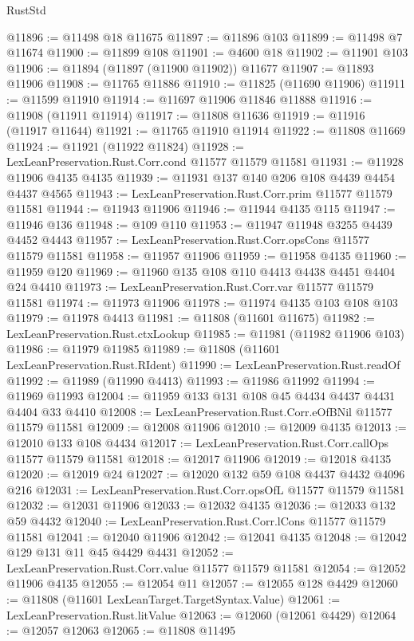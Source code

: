 \begin{lexlean}{RustStd}
\begin{coremodule}
@11896 := @11498 @18 @11675
@11897 := @11896 @103
@11899 := @11498 @7 @11674
@11900 := @11899 @108
@11901 := @4600 @18
@11902 := @11901 @103
@11906 := @11894 (@11897 (@11900 @11902)) @11677
@11907 := @11893 @11906
@11908 := @11765 @11886
@11910 := @11825 (@11690 @11906)
@11911 := @11599 @11910
@11914 := @11697 @11906 @11846 @11888
@11916 := @11908 (@11911 @11914)
@11917 := @11808 @11636
@11919 := @11916 (@11917 @11644)
@11921 := @11765 @11910 @11914
@11922 := @11808 @11669
@11924 := @11921 (@11922 @11824)
@11928 := LexLeanPreservation.Rust.Corr.cond @11577 @11579 @11581
@11931 := @11928 @11906 @4135 @4135
@11939 := @11931 @137 @140 @206 @108 @4439 @4454 @4437 @4565
@11943 := LexLeanPreservation.Rust.Corr.prim @11577 @11579 @11581
@11944 := @11943 @11906
@11946 := @11944 @4135 @115
@11947 := @11946 @136
@11948 := @109 @110
@11953 := @11947 @11948 @3255 @4439 @4452 @4443
@11957 := LexLeanPreservation.Rust.Corr.opsCons @11577 @11579 @11581
@11958 := @11957 @11906
@11959 := @11958 @4135
@11960 := @11959 @120
@11969 := @11960 @135 @108 @110 @4413 @4438 @4451 @4404 @24 @4410
@11973 := LexLeanPreservation.Rust.Corr.var @11577 @11579 @11581
@11974 := @11973 @11906
@11978 := @11974 @4135 @103 @108 @103
@11979 := @11978 @4413
@11981 := @11808 (@11601 @11675)
@11982 := LexLeanPreservation.Rust.ctxLookup
@11985 := @11981 (@11982 @11906 @103)
@11986 := @11979 @11985
@11989 := @11808 (@11601 LexLeanPreservation.Rust.RIdent)
@11990 := LexLeanPreservation.Rust.readOf
@11992 := @11989 (@11990 @4413)
@11993 := @11986 @11992
@11994 := @11969 @11993
@12004 := @11959 @133 @131 @108 @45 @4434 @4437 @4431 @4404 @33 @4410
@12008 := LexLeanPreservation.Rust.Corr.eOfBNil @11577 @11579 @11581
@12009 := @12008 @11906
@12010 := @12009 @4135
@12013 := @12010 @133 @108 @4434
@12017 := LexLeanPreservation.Rust.Corr.callOps @11577 @11579 @11581
@12018 := @12017 @11906
@12019 := @12018 @4135
@12020 := @12019 @24
@12027 := @12020 @132 @59 @108 @4437 @4432 @4096 @216
@12031 := LexLeanPreservation.Rust.Corr.opsOfL @11577 @11579 @11581
@12032 := @12031 @11906
@12033 := @12032 @4135
@12036 := @12033 @132 @59 @4432
@12040 := LexLeanPreservation.Rust.Corr.lCons @11577 @11579 @11581
@12041 := @12040 @11906
@12042 := @12041 @4135
@12048 := @12042 @129 @131 @11 @45 @4429 @4431
@12052 := LexLeanPreservation.Rust.Corr.value @11577 @11579 @11581
@12054 := @12052 @11906 @4135
@12055 := @12054 @11
@12057 := @12055 @128 @4429
@12060 := @11808 (@11601 LexLeanTarget.TargetSyntax.Value)
@12061 := LexLeanPreservation.Rust.litValue
@12063 := @12060 (@12061 @4429)
@12064 := @12057 @12063
@12065 := @11808 @11495

\end{coremodule}
\end{lexlean}
